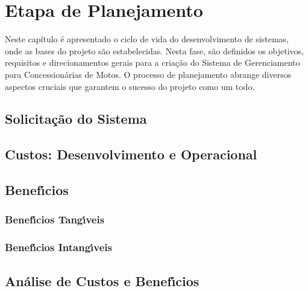 
\chapter{Etapa de Planejamento}


Neste capítulo é apresentado o ciclo de vida do desenvolvimento de sistemas, onde as bases do projeto são estabelecidas. Nesta fase, são definidos os objetivos, requisitos e direcionamentos gerais para a criação do Sistema de Gerenciamento para Concessionárias de Motos. O processo de planejamento abrange diversos aspectos cruciais que garantem o sucesso do projeto como um todo.


\section{Solicita\c{c}\~{a}o do Sistema}


\section{Custos: Desenvolvimento e Operacional} 


\section{Benef\'{\i}cios}


       \subsection{Benef\'{\i}cios Tang\'{\i}veis}


       \subsection{Benef\'{\i}cios Intang\'{\i}veis}


\section{An\'{a}lise de Custos e Benef\'{\i}cios}





